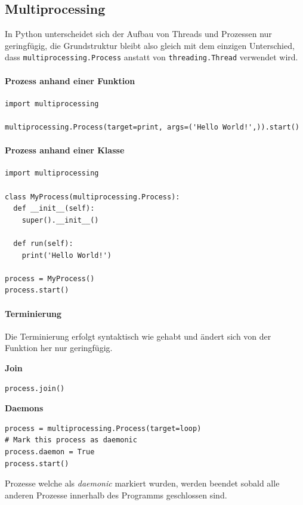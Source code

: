 \documentclass[a4paper,11pt]{article}
\begin{document}
\newpage

\subsection{Multiprocessing}
In Python unterscheidet sich der Aufbau von Threads und Prozessen nur geringf\"ugig,
die Grundstruktur bleibt also gleich mit dem einzigen Unterschied, dass \texttt{multiprocessing.Process} anstatt von \texttt{threading.Thread} verwendet wird.

\paragraph{Prozess anhand einer Funktion}
\begin{verbatim}
import multiprocessing

multiprocessing.Process(target=print, args=('Hello World!',)).start()
\end{verbatim}

\paragraph*{Prozess anhand einer Klasse}
\begin{verbatim}
import multiprocessing

class MyProcess(multiprocessing.Process):
  def __init__(self):
    super().__init__()

  def run(self):
    print('Hello World!')

process = MyProcess()
process.start()
\end{verbatim}

\paragraph{Terminierung}
\begin{flushleft}
Die Terminierung erfolgt syntaktisch wie gehabt und \"andert sich von der Funktion her nur geringf\"ugig.
\end{flushleft}
\textbf{Join}\quad
\begin{verbatim}
process.join()
\end{verbatim}
\textbf{Daemons}\quad
\begin{verbatim}
process = multiprocessing.Process(target=loop)
# Mark this process as daemonic
process.daemon = True
process.start()
\end{verbatim}
Prozesse welche als \textit{daemonic} markiert wurden, werden beendet sobald alle anderen Prozesse innerhalb des Programms geschlossen sind.

%
%
\end{document}
